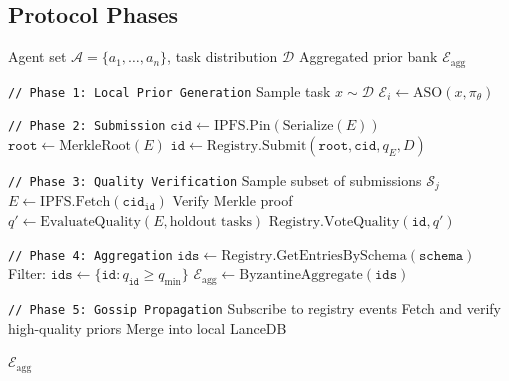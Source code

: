 \documentclass[11pt]{article}
\begin{document}
\subsection{Protocol Phases}

\begin{algorithm}[H]
\caption{DSO Protocol: Full Lifecycle}
\label{alg:dso-lifecycle}
\begin{algorithmic}[1]
\Require Agent set $\mathcal{A} = \{a_1, \ldots, a_n\}$, task distribution $\mathcal{D}$
\Ensure Aggregated prior bank $\mathcal{E}_{\text{agg}}$

\State \texttt{// Phase 1: Local Prior Generation}
    \State Sample task $x \sim \mathcal{D}$
    \State $\mathcal{E}_i \gets \text{ASO}(x, \pi_\theta)$
\EndFor

\State \texttt{// Phase 2: Submission}
        \State $\texttt{cid} \gets \text{IPFS.Pin}(\text{Serialize}(E))$
        \State $\texttt{root} \gets \text{MerkleRoot}(E)$
        \State $\texttt{id} \gets \text{Registry.Submit}(\texttt{root}, \texttt{cid}, q_E, D)$
    \EndFor
\EndFor

\State \texttt{// Phase 3: Quality Verification}
    \State Sample subset of submissions $\mathcal{S}_j$
        \State $E \gets \text{IPFS.Fetch}(\texttt{cid}_{\texttt{id}})$
        \State Verify Merkle proof
        \State $q' \gets \text{EvaluateQuality}(E, \text{holdout tasks})$
        \State $\text{Registry.VoteQuality}(\texttt{id}, q')$
    \EndFor
\EndFor

\State \texttt{// Phase 4: Aggregation}
\State $\texttt{ids} \gets \text{Registry.GetEntriesBySchema}(\texttt{schema})$
\State Filter: $\texttt{ids} \gets \{\texttt{id} : q_{\texttt{id}} \geq q_{\min}\}$
\State $\mathcal{E}_{\text{agg}} \gets \text{ByzantineAggregate}(\texttt{ids})$

\State \texttt{// Phase 5: Gossip Propagation}
    \State Subscribe to registry events
    \State Fetch and verify high-quality priors
    \State Merge into local LanceDB
\EndFor

\State \Return $\mathcal{E}_{\text{agg}}$
\end{algorithmic}
\end{algorithm}
\end{document}
